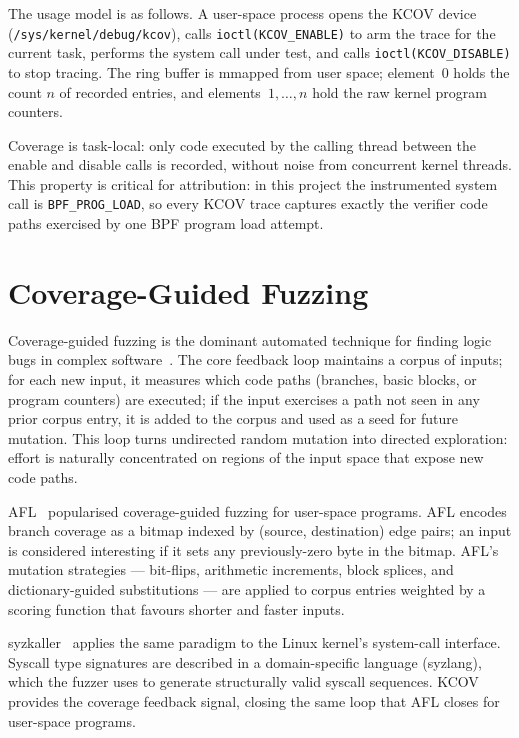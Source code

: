 The usage model is as follows.
A user-space process opens the KCOV device (\texttt{/sys/kernel/debug/kcov}),
calls \texttt{ioctl(KCOV\_ENABLE)} to arm the trace for the current task,
performs the system call under test, and calls \texttt{ioctl(KCOV\_DISABLE)} to
stop tracing.
The ring buffer is mmapped from user space; element~0 holds the count $n$ of
recorded entries, and elements~$1,\ldots,n$ hold the raw kernel program counters.

Coverage is task-local: only code executed by the calling thread between the
enable and disable calls is recorded, without noise from concurrent kernel threads.
This property is critical for attribution: in this project the instrumented system
call is \texttt{BPF\_PROG\_LOAD}, so every KCOV trace captures exactly the
verifier code paths exercised by one BPF program load attempt.

\section{Coverage-Guided Fuzzing}
\label{sec:fuzzing}

Coverage-guided fuzzing is the dominant automated technique for finding logic
bugs in complex software~\cite{afl,syzkaller}.
The core feedback loop maintains a corpus of inputs; for each new input, it
measures which code paths (branches, basic blocks, or program counters) are
executed; if the input exercises a path not seen in any prior corpus entry, it is
added to the corpus and used as a seed for future mutation.
This loop turns undirected random mutation into directed exploration: effort is
naturally concentrated on regions of the input space that expose new code paths.

AFL~\cite{afl} popularised coverage-guided fuzzing for user-space programs.
AFL encodes branch coverage as a bitmap indexed by (source, destination) edge
pairs; an input is considered interesting if it sets any previously-zero byte
in the bitmap.
AFL's mutation strategies --- bit-flips, arithmetic increments, block splices,
and dictionary-guided substitutions --- are applied to corpus entries weighted
by a scoring function that favours shorter and faster inputs.

syzkaller~\cite{syzkaller} applies the same paradigm to the Linux kernel's
system-call interface.
Syscall type signatures are described in a domain-specific language (syzlang),
which the fuzzer uses to generate structurally valid syscall sequences.
KCOV provides the coverage feedback signal, closing the same loop that AFL
closes for user-space programs.

